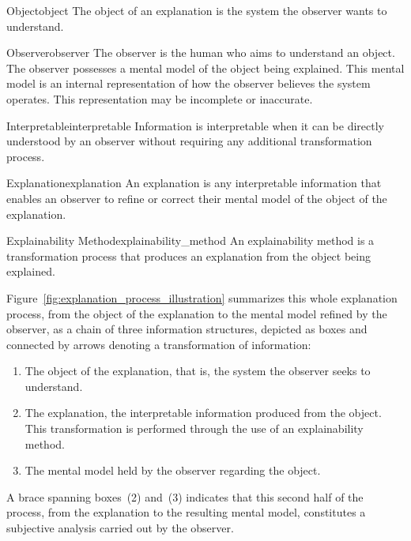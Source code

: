 \begin{definition}{Object}{object}
The object of an explanation is the system the observer wants to understand.
\end{definition}

\begin{definition}{Observer}{observer}
The observer is the human who aims to understand an object.
The observer possesses a mental model of the object being explained.
This mental model is an internal representation of how the observer believes the system operates.
This representation may be incomplete or inaccurate.
\end{definition}

\begin{definition}{Interpretable}{interpretable}
Information is interpretable when it can be directly understood by an observer without requiring any additional transformation process.
\end{definition}

\begin{definition}{Explanation}{explanation}
An explanation is any interpretable information that enables an observer to refine or correct their mental model of the object of the explanation.
\end{definition}

\begin{definition}{Explainability Method}{explainability_method}
An explainability method is a transformation process that produces an explanation from the object being explained.
\end{definition}

Figure~\ref{fig:explanation_process_illustration} summarizes this whole explanation process, from the object of the explanation to the mental model refined by the observer, as a chain of three information structures, depicted as boxes and connected by arrows denoting a transformation of information:
\begin{enumerate}
    \item[(1)] The object of the explanation, that is, the system the observer seeks to understand.
    \item[(2)] The explanation, the interpretable information produced from the object.
    This transformation is performed through the use of an explainability method.
    \item[(3)] The mental model held by the observer regarding the object.
\end{enumerate}
A brace spanning boxes~(2) and~(3) indicates that this second half of the process, from the explanation to the resulting mental model, constitutes a subjective analysis carried out by the observer.

